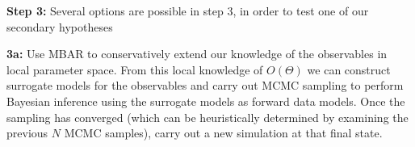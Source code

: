 \documentclass{report}
\begin{document}
\begin{outline}
\begin{outline}
\begin{outline}
\begin{outline}
\begin{outline}
          \item{\textbf{Step 3:} Several options are possible in step 3, in order to test one of our secondary hypotheses}
          \begin{outline}
            \item{\textbf{3a:} Use MBAR to conservatively extend our knowledge of the observables in local parameter space. From this local knowledge of $O\left(\Theta\right)$ we can construct
                  surrogate models for the observables and carry out MCMC sampling to perform Bayesian inference using the surrogate models as forward data models. Once the sampling has converged (which can be
                  heuristically determined by examining the previous $N$ MCMC samples), carry out a new simulation at that final state.}

\end{outline}
\end{outline}
\end{outline}
\end{outline}
\end{outline}
\end{outline}
\end{document}
